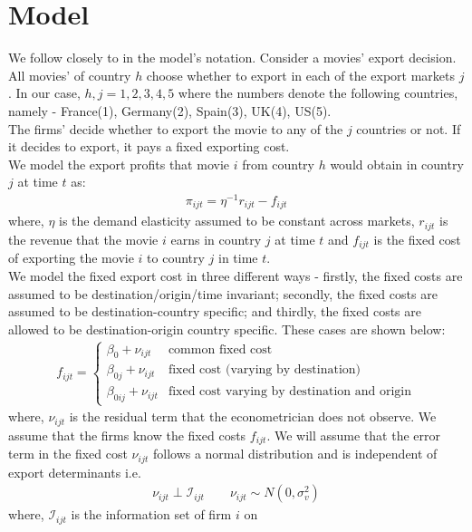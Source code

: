 \documentclass[11pt, letterpaper]{article} \usepackage{amsmath}
\begin{document}
\section{Model}
We follow closely to \citep{dickstein2018} in the model's
notation. Consider a movies' export decision. All movies' of country
$h$ choose whether to export in each of the export markets $j$. In our
case, $h,j=1,2,3,4,5$ where the numbers denote the following
countries, namely - France(1), Germany(2), Spain(3), UK(4), US(5).\\
The firms' decide whether to export the movie to any of the $j$
countries or not. If it decides to export, it pays a fixed exporting
cost. \\
We model the export profits that movie $i$ from country $h$ would
obtain in country $j$ at time $t$ as:
\begin{align*}
  \pi_{ijt} = \eta^{-1}r_{ijt} - f_{ijt}
\end{align*}
where, $\eta$ is the demand elasticity assumed to be constant across
markets, $r_{ijt}$ is the revenue that the movie $i$ earns in country
$j$ at time $t$ and $f_{ijt}$ is the fixed cost of exporting the movie
$i$ to country $j$ in time $t$. \\
We model the fixed export cost in three different ways - firstly, the
fixed costs are assumed to be destination/origin/time invariant;
secondly, the fixed costs are assumed to be destination-country
specific; and thirdly, the fixed costs are allowed to be
destination-origin country specific. These cases are shown below:
\begin{align*}
  f_{ijt} = \begin{cases}
    \beta_0 + \nu_{ijt} & \text{common fixed cost}\\
    \beta_{0j} + \nu_{ijt} & \text{fixed cost (varying by destination)}\\
    \beta_{0ij} + \nu_{ijt} & \text{fixed cost varying by destination
      and origin}
  \end{cases}
\end{align*}
where, $\nu_{ijt}$ is the residual term that the econometrician does
not observe. We assume that the firms know the fixed costs $f_{ijt}$.
We will assume that the error term in the fixed cost $\nu_{ijt}$
follows a normal distribution and is independent of export
determinants i.e.
\begin{align*}
  \nu_{ijt} \perp \mathcal{I}_{ijt} \qquad \nu_{ijt} \sim N(0, \sigma_v^2)
\end{align*}
where, $\mathcal{I}_{ijt}$ is the information set of firm $i$ on
\end{document}
